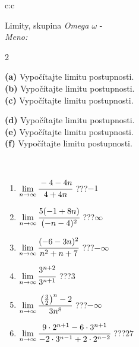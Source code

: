 \documentclass[10pt]{report}
\begin{document}
\newpage
\thispagestyle{empty}
\begin{tabular}{c:c}
\begin{minipage}[c][104.5mm][t]{0.5\linewidth}
\begin{center}
\vspace{5mm}
{\huge Limity, skupina \textit{Omega $\omega$} -}\\[5mm]
\textit{Meno:}\phantom{xxxxxxxxxxxxxxxxxxxxxxxxxxxxxxxxxxxxxxxxxxxxxxxxxxxxxxxxxxxxxxxxx}\\[5mm]
\begin{minipage}{0.95\linewidth}
\begin{center}
{\small \begin{multicols}{2} \raggedright
\textbf{(a)} Vypočítajte limitu postupnosti. \\[1mm]
\textbf{(b)} Vypočítajte limitu postupnosti. \\[1mm]
\textbf{(c)} Vypočítajte limitu postupnosti. \par \columnbreak
\textbf{(d)} Vypočítajte limitu postupnosti. \\[1mm]
\textbf{(e)} Vypočítajte limitu postupnosti. \\[1mm]
\textbf{(f)} Vypočítajte limitu postupnosti.
\end{multicols}
}
\end{center}
\end{minipage}
\\[1mm]
\begin{minipage}{0.79\linewidth}
\begin{center}
\begin{varwidth}{\linewidth}
\setlength{\itemsep}{0pt}
\begin{enumerate}
\footnotesizerr
\item $\lim\limits_{n\to\infty}\cfrac{-4-4n}{4+4n}$\quad \dotfill\; ???\;\dotfill \quad $-1$
\item $\lim\limits_{n\to\infty}\cfrac{5(-1+8n)}{(-n-4)^2}$\quad \dotfill\; ???\;\dotfill \quad $\infty$
\item $\lim\limits_{n\to\infty}\cfrac{(-6-3n)^2}{n^2+n+7}$\quad \dotfill\; ???\;\dotfill \quad $-\infty$
\item $\lim\limits_{n\to\infty}\cfrac{3^{n+2}}{3^{n+1}}$\quad \dotfill\; ???\;\dotfill \quad $3$
\item $\lim\limits_{n\to\infty}\cfrac{\left(\frac{3}{2}\right)^n -2}{3n^{8}}$\quad \dotfill\; ???\;\dotfill \quad $-\infty$
\item $\lim\limits_{n\to\infty}\cfrac{9\cdot 2^{n+1}-6\cdot 3^{n+1}}{-2\cdot 3^{n-1}+2\cdot 2^{n-2}}$\quad \dotfill\; ???\;\dotfill \quad $27$

\end{enumerate}
\end{varwidth}
\end{center}
\end{minipage}
\end{center}
\end{minipage}
\end{tabular}
\end{document}

